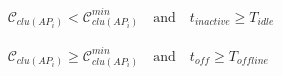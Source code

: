 \documentclass[10pt]{article}
\begin{document}
\begin{align*}
\mathcal{C}_{clu(AP_{i})} < \mathcal{C}^{min}_{clu(AP_{i})} \quad \mathrm{and} \quad t_{inactive} \geq T_{idle}
\\
\\
\\
\mathcal{C}_{clu(AP_{i})} \geq \mathcal{C}^{min}_{clu(AP_{i})} \quad \mathrm{and} \quad t_{off} \geq T_{offline}\end{align*}
\end{document}
